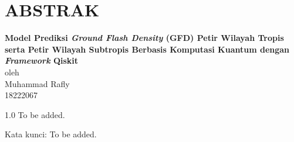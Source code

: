\chapter*{ABSTRAK}

\begin{center}

    \textbf{Model Prediksi \textit{Ground Flash Density} (GFD) Petir Wilayah Tropis serta Petir Wilayah Subtropis Berbasis Komputasi Kuantum dengan \textit{Framework} Qiskit} \\
    \vspace{0.4cm}
    oleh \\
    \vspace{0.4cm}
    Muhammad Rafly\\
    18222067\\
\end{center}


\begin{spacing}{1.0}
To be added.

Kata kunci: To be added.
\end{spacing}

